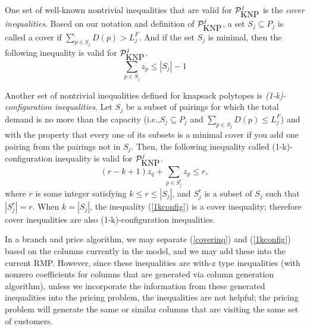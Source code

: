 One set of well-known nontrivial inequalities that are valid for
$\mathcal{P}^j_{\mbox{KNP}}$ is the {\em cover inequalities}. Based on our notation and
 definition of $\mathcal{P}^j_{\mbox{KNP}}$, a set $S_j \subseteq P_j$ is called a cover if
$\sum_{p \in S_j}D(p) > L^F_j$. And if the set $S_j$ is minimal,
then the following inequality is valid for $\mathcal{P}^j_{\mbox{KNP}}$.
\begin{equation}
\sum_{p \in S_j}z_{p} \leq |S_j|-1 \label{coverinq}
\end{equation}


Another set of nontrivial inequalities defined for knapsack
polytopes is {\em (1-k)-configuration inequalities}. Let $S_j$ be a
subset of pairings for which the total demand is no more than the
capacity (i.e.,$S_j \subseteq P_j$ and $\sum_{p \in S_j}D(p)\leq
L^F_j$) and with the property that every one of its subsets is a
minimal cover if you add one pairing from the pairings not in $S_j$.
Then, the following inequality called (1-k)-configuration inequality
is valid for $\mathcal{P}^j_{\mbox{KNP}}$.
\begin{equation}
(r - k + 1)z_q + \sum_{p \in S^r_j}z_{p} \leq r, \label{1kconfig}
\end{equation}
where  $r$ is some integer satisfying $k \leq r \leq |S_j|$, and
$S^r_j$ is a subset of $S_j$ such that $|S^r_j| = r$. When $k =
|S_j|$, the inequality (\ref{1kconfig}) is a cover inequality;
therefore cover inequalities are also (1-k)-configuration
inequalities.

In a branch and price algorithm, we may separate
(\ref{coverinq}) and  (\ref{1kconfig}) based on the columns
currently in the model, and we may add these into the current RMP.
However, since these inequalities are with-z type inequalities (with
nonzero coefficients for columns that are generated via column
generation algorithm), unless we incorporate the information from
these generated inequalities into the pricing problem, the
inequalities are not helpful; the pricing problem will generate the
same or similar columns that are visiting the same set of customers.


